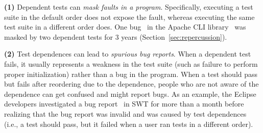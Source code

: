 \textbf{(1)}
Dependent tests can
\emph{mask faults in a program}. Specifically, executing a test suite in the
default order does not expose the fault, whereas
executing the same test suite in a different order does. 
One bug~\cite{clibug} in the Apache CLI library~\cite{cli}
was masked by two dependent tests
for 3 years (Section~\ref{sec:repercussion}).

\textbf{(2)}
Test dependences can lead to \emph{spurious bug reports}.
When a dependent test fails, it usually represents
a weakness in the test
suite (such as failure to perform proper initialization) rather than a bug
in the program. 
When a test should pass but
fails after reordering due to the dependence,
people who are not aware of the dependence can get confused
and might report bugs.
%
As an example, the Eclipse developers
investigated a bug report~\cite{eclipsebug} in SWT for
more than a month before realizing that the 
bug report was invalid and was caused by test dependences
(i.e., a test should pass, but it failed when a user
ran tests in a different order).
%



